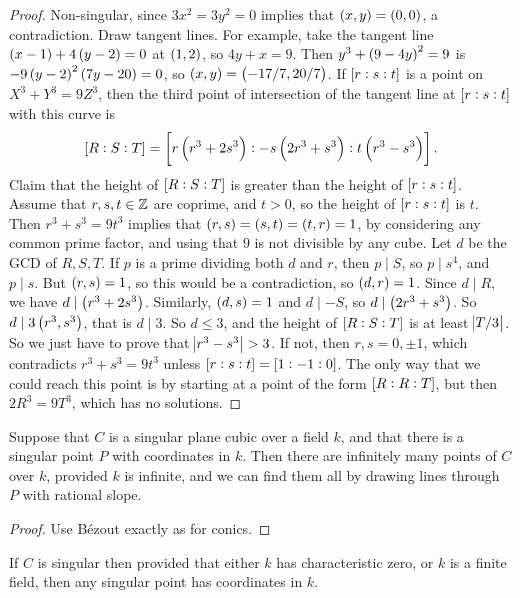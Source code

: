 \begin{proof}
Non-singular, since $ 3x^2 = 3y^2 = 0 $ implies that $ \br{x, y} = \br{0, 0} $, a contradiction. Draw tangent lines. For example, take the tangent line $ \br{x - 1} + 4\br{y - 2} = 0 $ at $ \br{1, 2} $, so $ 4y + x = 9 $. Then $ y^3 + \br{9 - 4y}^2 = 9 $ is $ -9\br{y - 2}^2\br{7y - 20} = 0 $, so $ \br{x, y} = \br{-17 / 7, 20 / 7} $. If $ \sbr{r : s : t} $ is a point on $ X^3 + Y^3 = 9Z^3 $, then the third point of intersection of the tangent line at $ \sbr{r : s : t} $ with this curve is
$$ \sbr{R : S : T} = \sbr{r\br{r^3 + 2s^3} : -s\br{2r^3 + s^3} : t\br{r^3 - s^3}}. $$
Claim that the height of $ \sbr{R : S : T} $ is greater than the height of $ \sbr{r : s : t} $. Assume that $ r, s, t \in \mathbb{Z} $ are coprime, and $ t > 0 $, so the height of $ \sbr{r : s : t} $ is $ t $. Then $ r^3 + s^3 = 9t^3 $ implies that $ \br{r, s} = \br{s, t} = \br{t, r} = 1 $, by considering any common prime factor, and using that $ 9 $ is not divisible by any cube. Let $ d $ be the GCD of $ R, S, T $. If $ p $ is a prime dividing both $ d $ and $ r $, then $ p \mid S $, so $ p \mid s^4 $, and $ p \mid s $. But $ \br{r, s} = 1 $, so this would be a contradiction, so $ \br{d, r} = 1 $. Since $ d \mid R $, we have $ d \mid \br{r^3 + 2s^3} $. Similarly, $ \br{d, s} = 1 $ and $ d \mid -S $, so $ d \mid \br{2r^3 + s^3} $. So $ d \mid 3\br{r^3, s^3} $, that is $ d \mid 3 $. So $ d \le 3 $, and the height of $ \sbr{R : S : T} $ is at least $ \abs{T / 3} $. So we just have to prove that $ \abs{r^3 - s^3} > 3 $. If not, then $ r, s = 0, \pm 1 $, which contradicts $ r^3 + s^3 = 9t^3 $ unless $ \sbr{r : s : t} = \sbr{1 : -1 : 0} $. The only way that we could reach this point is by starting at a point of the form $ \sbr{R : R : T} $, but then $ 2R^3 = 9T^3 $, which has no solutions.
\end{proof}

\begin{algorithm}
Suppose that $ C $ is a singular plane cubic over a field $ k $, and that there is a singular point $ P $ with coordinates in $ k $. Then there are infinitely many points of $ C $ over $ k $, provided $ k $ is infinite, and we can find them all by drawing lines through $ P $ with rational slope.
\end{algorithm}

\begin{proof}
Use B\'ezout exactly as for conics.
\end{proof}

\begin{remark}
If $ C $ is singular then provided that either $ k $ has characteristic zero, or $ k $ is a finite field, then any singular point has coordinates in $ k $.
\end{remark}


